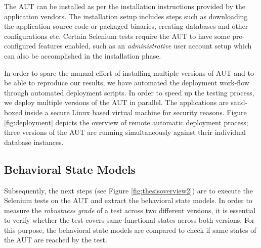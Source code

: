 The AUT can be installed as per the installation instructions provided by the application vendors. The installation setup includes steps such as downloading the application source code or packaged binaries, creating databases and other configurations etc. Certain Selenium tests require the AUT to have some pre-configured features enabled, such as an \textit{administrative} user account setup which can also be accomplished in the installation phase. 

In order to spare the manual effort of installing multiple versions of AUT and to be able to reproduce our results, we have automated the deployment work-flow through automated deployment scripts. In order to speed up the testing process, we deploy multiple versions of the AUT in parallel.  The applications are sand-boxed inside a secure Linux based virtual machine for security reasons. Figure \ref{fig:deployment} depicts the overview of remote automatic deployment process; three versions of the AUT are running simultaneously against their individual database instances.

\subsection{Behavioral State Models}
\label{stateModelExtraction}
Subsequently, the next steps (see Figure \ref{fig:thesisoverview2}) are to execute the Selenium tests on the AUT and extract the behavioral state models. In order to measure the \textit{robustness grade} of a test across two different versions, it is essential to verify whether the test covers same functional states across both versions. For this purpose, the behavioral state models are compared to check if same states of the AUT are reached by the test. 


